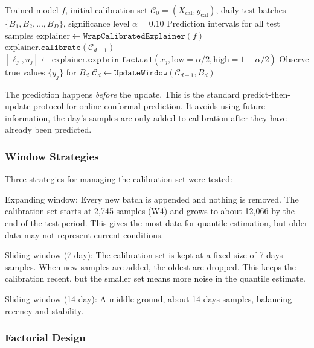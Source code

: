 \documentclass[12pt, a4paper, oneside]{report}
\begin{document}
\begin{algorithm}[H]
\caption{Online Conformal Prediction (Predict-then-Update)}
\label{alg:online_cp}
\begin{algorithmic}[1]
\REQUIRE Trained model $f$, initial calibration set $\mathcal{C}_0 = (X_{\text{cal}}, y_{\text{cal}})$, daily test batches $\{B_1, B_2, \ldots, B_D\}$, significance level $\alpha = 0.10$
\ENSURE Prediction intervals for all test samples
\STATE $\text{explainer} \leftarrow \texttt{WrapCalibratedExplainer}(f)$ 
    \STATE $\text{explainer}.\texttt{calibrate}(\mathcal{C}_{d-1})$ 
        \STATE $[\ell_j, u_j] \leftarrow \text{explainer}.\texttt{explain\_factual}(x_j, \text{low}=\alpha/2, \text{high}=1-\alpha/2)$
    \ENDFOR
    \STATE Observe true values $\{y_j\}$ for $B_d$
    \STATE $\mathcal{C}_d \leftarrow \texttt{UpdateWindow}(\mathcal{C}_{d-1}, B_d)$ 
\ENDFOR
\end{algorithmic}
\end{algorithm}

The prediction happens \emph{before} the update. This is the standard predict-then-update protocol for online conformal prediction. It avoids using future information, the day's samples are only added to calibration after they have already been predicted.

\subsubsection{Window Strategies}

Three strategies for managing the calibration set were tested:

Expanding window: Every new batch is appended and nothing is removed. The calibration set starts at 2,745 samples (W4) and grows to about 12,066 by the end of the test period. This gives the most data for quantile estimation, but older data may not represent current conditions.

Sliding window (7-day): The calibration set is kept at a fixed size of 7 days samples. When new samples are added, the oldest are dropped. This keeps the calibration recent, but the smaller set means more noise in the quantile estimate.

Sliding window (14-day): A middle ground, about 14 days samples, balancing recency and stability.

\subsubsection{Factorial Design}
\end{document}
